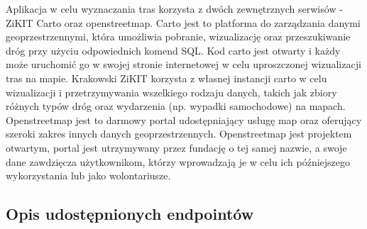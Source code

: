 Aplikacja w celu wyznaczania tras korzysta z dwóch zewnętrznych serwisów - ZiKIT Carto oraz openstreetmap. Carto jest to platforma do zarządzania danymi geoprzestrzennymi, która umożliwia pobranie, wizualizację oraz przeszukiwanie dróg przy użyciu odpowiednich komend SQL. Kod carto jest otwarty i każdy może uruchomić go w swojej stronie internetowej w celu uproszczonej wizualizacji tras na mapie. Krakowski ZiKIT korzysta z własnej instancji carto w celu wizualizacji i przetrzymywania wszelkiego rodzaju danych, takich jak zbiory różnych typów dróg oraz wydarzenia (np. wypadki samochodowe) na mapach. Openstreetmap jest to darmowy portal udostępniający usługę map oraz oferujący szeroki zakres innych danych geoprzestrzennych. Openstreetmap jest projektem otwartym, portal jest utrzymywany przez fundację o tej samej nazwie, a swoje dane zawdzięcza użytkownikom, którzy wprowadzają je w celu ich późniejszego wykorzystania lub jako wolontariusze.

\subsection{Opis udostępnionych endpointów}

